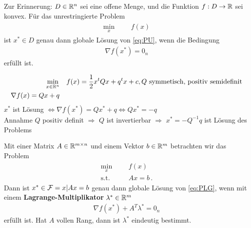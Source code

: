Zur Erinnerung: $D \in \mathbb R^n$ sei eine offene Menge, und die Funktion $f: D \rightarrow \mathbb R$ sei konvex. Für das unrestringierte Problem
	\begin{gather*} 
	\label{eq:PU}
  		\tag{PU}
  			\begin{aligned}
    			\min_x
    			& & & f(x)
  			\end{aligned}
	\end{gather*}
ist $x^* \in D$ genau dann globale Lösung von \eqref{eq:PU}, wenn die Bedingung
\begin{align*}
\nabla f(x^*) = 0_n
\end{align*}
erfüllt ist.

\begin{Beispiel} 
  	\begin{align}
   		\min_{x\in\mathbb R^n}
   		& & & f(x)=\frac{1}{2}x^tQx+q^tx+c, Q\text{ symmetisch, positiv semidefinit} \\
   		\nabla f(x)=Qx+q
  	\end{align}
$x^*$ ist Lösung $\Leftrightarrow \nabla f(x^*)=Qx^*+q \Leftrightarrow Qx^*=-q$ \\
Annahme $Q$ positiv definit $\Rightarrow$ $Q$ ist invertierbar $\Rightarrow$ $x^*=-Q^{-1}q$ ist Lösung des Problems
\end{Beispiel} 

Mit einer Matrix $A \in \mathbb R^{m\times n}$ und einem Vektor $b \in \mathbb R^m$ betrachten wir das Problem
	\begin{gather*}
	\label{eq:PLG}
  		\tag{PLG}
  			\begin{aligned}
    			\min_x
    			& & & f(x) \\
    			\text{s.t.}
    			& & & Ax=b \,.
  			\end{aligned}
	\end{gather*}
Dann ist $x^* \in \mathcal{F} = {x | Ax = b}$ genau dann globale Lösung von \eqref{eq:PLG},
wenn mit einem \textbf{Lagrange-Multiplikator} $\lambda^* \in \mathbb R^m$
\begin{align*}
\nabla f(x^*)+A^T \lambda^* = 0_n
\end{align*}
erfüllt ist. Hat $A$ vollen Rang, dann ist $\lambda^*$ eindeutig bestimmt.

